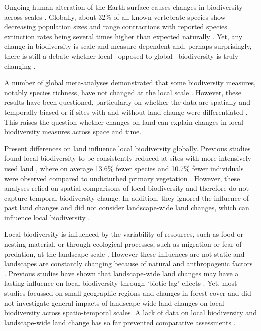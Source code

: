 Ongoing human alteration of the Earth surface causes changes in biodiversity across scales \citep{Gibson2011,Murphy2014,Newbold2015}. Globally, about 32\% of all known vertebrate species show decreasing population sizes and range contractions \citep{Ceballos2017,WWF2018} with reported species extinction rates being several times higher than expected naturally \citep{Brooks2002,Pimm2014}. Yet, any change in biodiversity is scale and measure dependent \citep{Sax2003,Chase2013} and, perhaps surprisingly, there is still a debate whether local \textendash\ opposed to global \textendash\ biodiversity is truly changing \citep{Thomas2013,McGill2014}. 

A number of global meta-analyses demonstrated that some biodiversity measures, notably species richness, have not changed at the local scale \citep{Vellend2013,Vellend2017,Dornelas2014}. However, these results have been questioned, particularly on whether the data are spatially and temporally biased \citep{Gonzalez2016} or if sites with and without land change were differentiated \citep{Cardinale2018}. This raises the question whether changes on land can explain changes in local biodiversity measures across space and time. 

Present differences on land influence local biodiversity globally. Previous studies found local biodiversity to be consistently reduced at sites with more intensively used land \citep{Murphy2014,Newbold2015,Alroy2017}, where on average 13.6\% fewer species and 10.7\% fewer individuals were observed compared to undisturbed primary vegetation \citep{Newbold2015}. However, these analyses relied on spatial comparisons of local biodiversity and therefore do not capture temporal biodiversity change. In addition, they ignored the influence of past land changes \citep{Perring2018,Jung2018} and did not consider landscape-wide land changes, which can influence local biodiversity \citep{Tscharntke2012,Turner2015,Miguet2015}. 

Local biodiversity is influenced by the variability of resources, such as food or nesting material, or through ecological processes, such as migration or fear of predation, at the landscape scale \citep{Hanski2000,Chase2003,Turner2015,Fernandez2016}. However these influences are not static and landscapes are constantly changing because of natural and anthropogenic factors \citep{Pickett1985,Manning2009,Turner2015}. Previous studies have shown that landscape-wide land changes may have a lasting influence on local biodiversity through ‘biotic lag’ effects \citep{Metzger2009,Ewers2013}. Yet, most studies focussed on small geographic regions and changes in forest cover \citep{Rittenhouse2010} and did not investigate general impacts of landscape-wide land changes on local biodiversity across spatio-temporal scales. A lack of data on local biodiversity and landscape-wide land change has so far prevented comparative assessments \citep{DePalma2018}.

